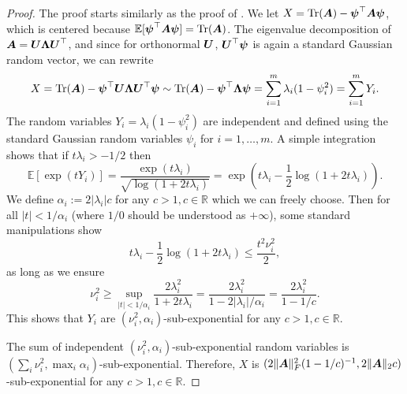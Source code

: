 \begin{proof}
    The proof starts similarly as the proof of \cite[Lemma 3]{cortinovis-2022-randomized-trace}. We let $X = \operatorname{Tr}(\boldsymbol{A}) - \boldsymbol{\psi}^{\top} \boldsymbol{A} \boldsymbol{\psi}$, which is centered because $\mathbb{E}[\boldsymbol{\psi}^{\top} \boldsymbol{A} \boldsymbol{\psi}] = \operatorname{Tr}(\boldsymbol{A})$. The eigenvalue decomposition of $\boldsymbol{A} = \boldsymbol{U} \boldsymbol{\Lambda} \boldsymbol{U}^{\top}$, and since for orthonormal $\boldsymbol{U}$, $\boldsymbol{U}^{\top} \boldsymbol{\psi}$ is again a standard Gaussian random vector, we can rewrite
    \begin{equation}
        X = \operatorname{Tr}(\boldsymbol{A}) - \boldsymbol{\psi}^{\top} \boldsymbol{U}\boldsymbol{\Lambda} \boldsymbol{U}^{\top} \boldsymbol{\psi}  \sim \operatorname{Tr}(\boldsymbol{A}) - \boldsymbol{\psi}^{\top} \boldsymbol{\Lambda} \boldsymbol{\psi}  = \sum_{i=1}^{m} \lambda_i (1 - \psi_i^2) = \sum_{i=1}^{m} Y_i.
    \end{equation}
    The random variables $Y_i = \lambda_i(1 - \psi_i^2)$ are independent and defined using the standard Gaussian random variables $\psi_i$ for $i=1, \dots, m$. A simple integration shows that if $t \lambda_i > - 1/2$ then
    \begin{equation}
        \mathbb{E}[\exp(t Y_i)] = \frac{\exp\left(t \lambda_i\right) }{\sqrt{\log(1 + 2t \lambda_i)}} = \exp\left(t \lambda_i - \frac{1}{2} \log(1 + 2t \lambda_i) \right).
    \end{equation}
    We define $\alpha_i := 2 |\lambda_i| c$ for any $c > 1, c \in \mathbb{R}$ which we can freely choose. Then for all $|t| < 1 / \alpha_i$ (where $1/0$ should be understood as $+ \infty$), some standard manipulations show
    \begin{equation}
        t \lambda_i - \frac{1}{2} \log(1 + 2t \lambda_i) \leq \frac{t^2 \nu_i^2}{2},
    \end{equation}
    as long as we ensure
    \begin{equation}
        \nu_i^2 \geq \sup_{|t| < 1 / \alpha_i} \frac{2 \lambda_i^2}{1 + 2 t \lambda_i} = \frac{2 \lambda_i^2}{1 - 2 |\lambda_i| / \alpha_i} = \frac{2 \lambda_i^2}{1 - 1 / c}.
    \end{equation}
    This shows that $Y_i$ are $(\nu_i^2, \alpha_i)$-sub-exponential for any $c > 1, c \in \mathbb{R}$.

    The sum of independent $(\nu_i^2, \alpha_i)$-sub-exponential random variables is $(\sum_i \nu_i^2, \max_i \alpha_i)$-sub-exponential. Therefore, $X$ is $(2 \lVert \boldsymbol{A} \rVert _F^2 (1 - 1/c)^{-1}, 2 \lVert \boldsymbol{A} \rVert _2 c)$-sub-exponential for any $c > 1, c \in \mathbb{R}$.
\end{proof}

